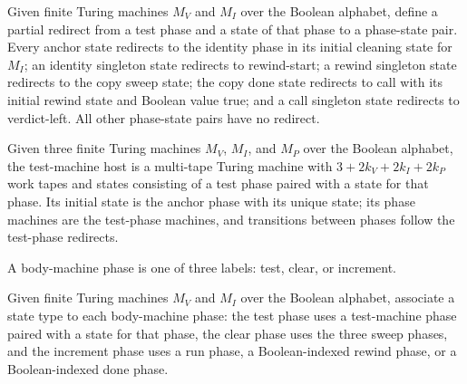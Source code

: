 \begin{definition}
\label{Complexity.b2b_testRedirect}
\leanok
{}
Given finite Turing machines $M_V$ and $M_I$ over the Boolean alphabet, define a partial
redirect from a test phase and a state of that phase to a phase-state pair. Every anchor
state redirects to the identity phase in its initial cleaning state for $M_I$; an
identity singleton state redirects to rewind-start; a rewind singleton state redirects
to the copy sweep state; the copy done state redirects to call with its initial rewind
state and Boolean value true; and a call singleton state redirects to verdict-left. All
other phase-state pairs have no redirect.
\end{definition}

\begin{definition}
\label{Complexity.b2b_testTM}
\leanok
{}
Given three finite Turing machines $M_V$, $M_I$, and $M_P$ over the Boolean alphabet,
the test-machine host is a multi-tape Turing machine with $3+2k_V+2k_I+2k_P$ work tapes
and states consisting of a test phase paired with a state for that phase. Its initial
state is the anchor phase with its unique state; its phase machines are the test-phase
machines, and transitions between phases follow the test-phase redirects.
\end{definition}

\begin{definition}
\label{Complexity.B2bBodyPhase}
\leanok
A body-machine phase is one of three labels: test, clear, or increment.
\end{definition}

\begin{definition}
\label{Complexity.b2b_bodyState}
\leanok
{}
Given finite Turing machines $M_V$ and $M_I$ over the Boolean alphabet, associate a
state type to each body-machine phase: the test phase uses a test-machine phase paired
with a state for that phase, the clear phase uses the three sweep phases, and the
increment phase uses a run phase, a Boolean-indexed rewind phase, or a Boolean-indexed
done phase.
\end{definition}


